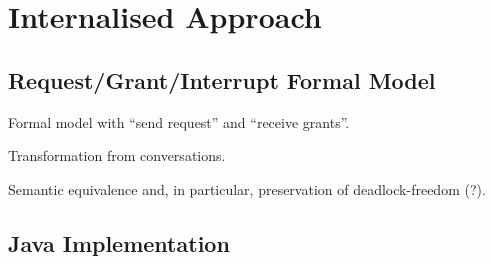 
\section{Internalised Approach}
\label{sec:internal}


\subsection{Request/Grant/Interrupt Formal Model}
\label{sec:internal:model}

Formal model with ``send request'' and ``receive grants''.

Transformation from conversations.

Semantic equivalence and, in particular, preservation of deadlock-freedom
(?).


\subsection{Java Implementation}
\label{sec:java}

